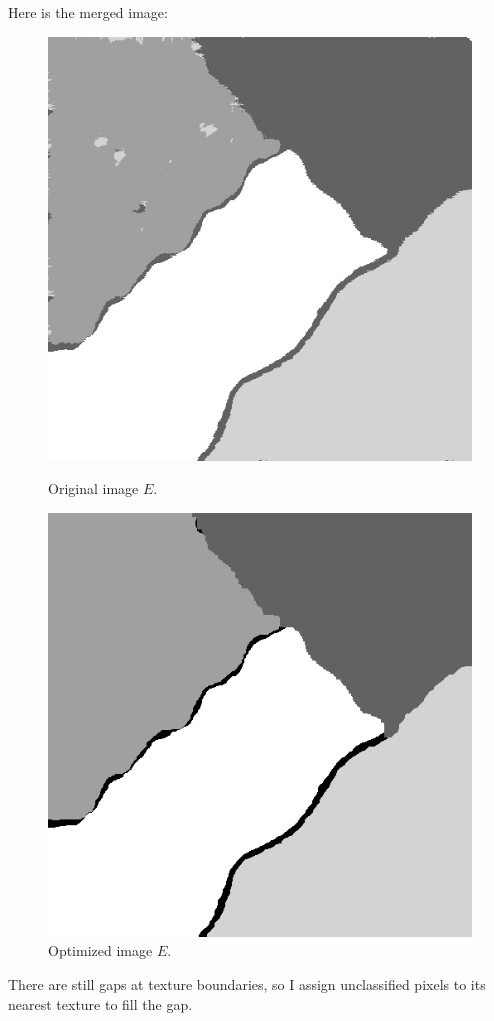 \documentclass[12pt,a4paper,notitlepage,oneside,amsmath,amssymb]{article}
\begin{document}
\begin{CJK*}{UTF8}{bkai}
\begin{enumerate}[label=(\alph*)]
\begin{enumerate}
	\end{enumerate}

	\newpage
	Here is the merged image:

	\begin{figure}[hbt!]
		\centering
		\begin{minipage}{.4\textwidth}
			\centering
			\includegraphics[width=.6\linewidth]{image_E}
			\caption*{Original image \(E\).}
		\end{minipage}%
		\begin{minipage}{.4\textwidth}
			\centering
			\includegraphics[width=.6\linewidth]{image_E2}
			\caption*{Optimized image \(E\).}
		\end{minipage}
	\end{figure}

There are still gaps at texture boundaries, so I assign unclassified pixels to its nearest texture to fill the gap.


\end{enumerate}
\end{CJK*}
\end{document}
